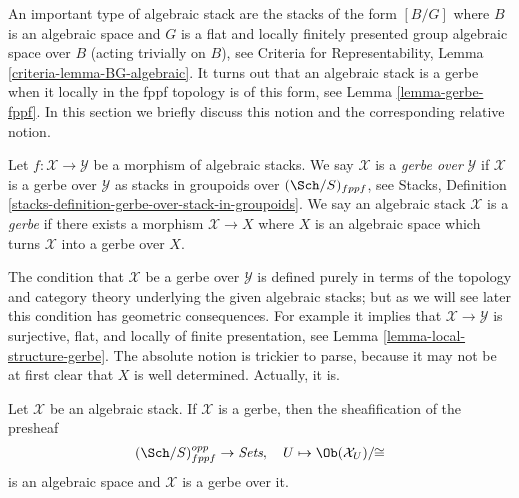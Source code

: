 \noindent
An important type of algebraic stack are the stacks of the
form $[B/G]$ where $B$ is an algebraic space and $G$ is a flat
and locally finitely presented group algebraic space over $B$
(acting trivially on $B$), see
Criteria for Representability, Lemma \ref{criteria-lemma-BG-algebraic}.
It turns out that an algebraic stack is a gerbe when it locally in the
fppf topology is of this form, see
Lemma \ref{lemma-gerbe-fppf}.
In this section we briefly discuss this notion and the corresponding
relative notion.

\begin{definition}
\label{definition-gerbe}
Let $f : \mathcal{X} \to \mathcal{Y}$ be a morphism of algebraic stacks.
We say $\mathcal{X}$ is a {\it gerbe over} $\mathcal{Y}$ if
$\mathcal{X}$ is a gerbe over $\mathcal{Y}$ as stacks
in groupoids over $(\Sch/S)_{fppf}$, see
Stacks, Definition \ref{stacks-definition-gerbe-over-stack-in-groupoids}.
We say an algebraic stack $\mathcal{X}$ is a {\it gerbe} if there exists
a morphism $\mathcal{X} \to X$ where $X$ is an algebraic space which
turns $\mathcal{X}$ into a gerbe over $X$.
\end{definition}

\noindent
The condition that $\mathcal{X}$ be a gerbe over $\mathcal{Y}$ is defined
purely in terms of the topology and category theory underlying the given
algebraic stacks; but as we will see later this condition has
geometric consequences. For example it implies that
$\mathcal{X} \to \mathcal{Y}$ is surjective, flat, and
locally of finite presentation, see
Lemma \ref{lemma-local-structure-gerbe}.
The absolute notion is trickier to parse, because it
may not be at first clear that $X$ is well determined. Actually, it is.

\begin{lemma}
\label{lemma-gerbe-over-iso-classes}
Let $\mathcal{X}$ be an algebraic stack. If $\mathcal{X}$ is a gerbe, then
the sheafification of the presheaf
$$
(\Sch/S)_{fppf}^{opp} \to \textit{Sets}, \quad
U \mapsto \Ob(\mathcal{X}_U)/\!\!\cong
$$
is an algebraic space and $\mathcal{X}$ is a gerbe over it.
\end{lemma}

